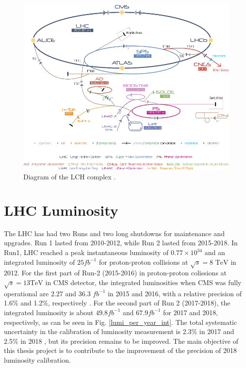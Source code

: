 \begin{center}
  \begin{figure}[ht]
    \centering
    \includegraphics[scale=.41]{Chapter1/lhc_complex_fig.png}
    \caption[LHC Complex]{Diagram of the LCH complex \cite{lhc_complex}.}
    \label{lhc_com}
  \end{figure}
\end{center}




\section{LHC Luminosity}
The LHC has had two Runs and two long shutdowns for maintenance and  upgrades. Run 1 lasted from 2010-2012, while Run 2 lasted from 2015-2018. In Run1, LHC reached a peak instantaneous luminosity of  $0.77 \times 10^{34}$  and an integrated luminosity of $25 fb^{-1}$  for proton-proton collisions at $\sqrt{s}=\text{8 TeV}$ in 2012\cite{LHC_status_2013}. For the first part of Run-2 (2015-2016) in proton-proton colissions at $\sqrt{s}=\text{13TeV}$ in CMS detector, the integrated luminosities when CMS was fully operational are $2.2$7 and $36.3$ $fb^{-1}$ in 2015 and 2016, with a relative precision of 1.6\% and 1.2\%, respectively \cite{lumi_precise_2015_2016}. For the second part of Run 2 (2017-2018), the integrated luminosity is about $49.8 fb^{-1} $ and $67.9 fb^{-1}$ for 2017 and 2018, respectively, as can be seen in Fig. \ref{lumi_per_year_int}. The total systematic uncertainty in the calibration of luminosity measurement is 2.3\% in 2017\cite{pas_17} and 2.5\% in 2018 \cite{pas_18}, but its precision remains to be improved. The main objective of this thesis project is to contribute to the improvement of the precision of 2018 luminosity calibration.


